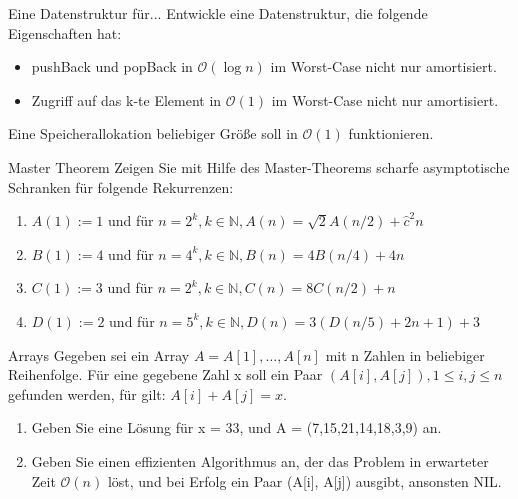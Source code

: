 \documentclass[18pt]{beamer}
\newcommand{\Oh}{\mathcal{O}}
\begin{document}
\begin{frame}{Eine Datenstruktur für...}
 Entwickle eine Datenstruktur, die folgende Eigenschaften hat:
 \begin{itemize}
  \item pushBack und popBack in $\Oh(\log n)$ im Worst-Case nicht nur amortisiert.
  \item Zugriff auf das k-te Element in $\Oh(1)$ im Worst-Case nicht nur amortisiert.
 \end{itemize}
Eine Speicherallokation beliebiger Größe soll in $\Oh(1)$ funktionieren.
\end{frame}

\begin{frame}{Master Theorem}
 Zeigen Sie mit Hilfe des Master-Theorems scharfe asymptotische Schranken für folgende Rekurrenzen:
 
 \begin{enumerate}[label=\alph* )]
  \item $A(1) := 1$ und für $n = 2^k, k \in \mathbb{N}, A(n) = \sqrt{2} A(n/2) + \hat{c}^2 n$
  \item $B(1) := 4$ und für $n = 4^k, k \in \mathbb{N}, B(n) = 4B(n/4) + 4n$
  \item $C(1) := 3$ und für $n = 2^k, k \in \mathbb{N}, C(n) = 8C(n/2) + n$
  \item $D(1) := 2$ und für $n = 5^k, k \in \mathbb{N}, D(n) = 3(D(n/5)+2n + 1) + 3$
 \end{enumerate}

\end{frame}

\begin{frame}{Arrays}
 Gegeben sei ein Array $A = A[1], \ldots, A[n]$ mit n Zahlen in beliebiger Reihenfolge.
 Für eine gegebene Zahl x soll ein Paar $(A[i], A[j]), 1 \leq i, j \leq n$ gefunden werden,
 für gilt: $A[i] + A[j] = x$.
 
 \begin{enumerate}[label=\alph*)]
  \item Geben Sie eine Lösung für x = 33, und A = (7,15,21,14,18,3,9) an.
  \item Geben Sie einen effizienten Algorithmus an, der das Problem in erwarteter Zeit $\Oh(n)$
  löst, und bei Erfolg ein Paar (A[i], A[j]) ausgibt, ansonsten NIL.
 \end{enumerate}

\end{frame}
\end{document}
